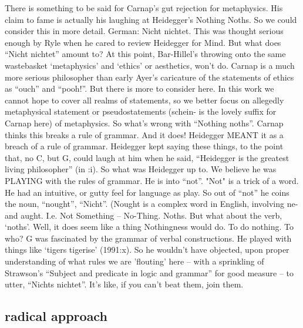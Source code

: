 \documentclass[10pt,titlepage]{book}
\begin{document}
There is something to be said for Carnap's gut rejection for metaphysics.
His claim to fame is actually his laughing at Heidegger's Nothing Noths.
So we could consider this in more detail.
German:  Nicht nichtet.
This was thought serious enough by Ryle when he cared to review Heidegger for Mind.
But what does ``Nicht nichtet'' amount to?
At this point, Bar-Hillel's throwing onto the same wastebasket `metaphysics' and `ethics' or aesthetics, won't do.
Carnap is a much more serious philosopher than early Ayer's caricature of the statements of ethics as ``ouch'' and ``pooh!''.
But there is more to consider here.
In this work we cannot hope to cover all realms of statements, so we better focus on allegedly metaphysical statement or pseudostatements (schein- is the lovely suffix for Carnap here) of metaphysics.
So what's wrong with ``Nothing noths''.
Carnap thinks this breaks a rule of grammar.
And it does!
Heidegger MEANT it as a breach of a rule of grammar.
Heidegger kept saying these things, to the point that, no C, but G, could laugh at him when he said, ``Heidegger is the greatest living philosopher'' (in \cite{grice89}:i).
So what was Heidegger up to.
We believe he was PLAYING with the rules of grammar.
He is into ``not''.
"Not" is a trick of a word.
He had an intuitive, or gutty feel for language as play.
So out of ``not'' he coins the noun, ``nought'', ``Nicht''.
(Nought is a complex word in English, involving ne- and aught.
I.e. Not Something -- No-Thing.
Noths.
But what about the verb, `noths'.
Well, it does  seem like a thing Nothingness would do.
To do nothing.
To who?
G was fascinated by the grammar of verbal constructions.
He played with things like `tigers  tigerise' (1991:x).
So he wouldn't have objected, upon proper understanding of what rules we are 'flouting' here -- with a sprinkling of Strawson's ``Subject and predicate in logic and grammar'' 
for good measure -- to utter, ``Nichts nichtet''.
It's like, if you can't beat them, join them.
 
\subsection{radical approach}
\end{document}
